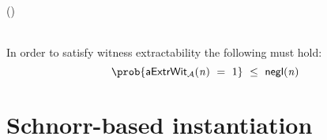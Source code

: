 \begin{definition}
\begin{center}
{\begin{varwidth}{\textwidth}
                \procedure[linenumbering, syntaxhighlight=auto]{$\procNonceOracle{\varSecParam}$} {
                    (\varNonceBob \opSeperate \varRandBob) \opFunResult \procSetupPartSig{\varSecParam} \\
                    \pcreturn \varRandBob
                }
                \procedure[linenumbering, syntaxhighlight=auto]{$\procSignPtOracle{\varMsg}{\varPubKeyAdv}{\varRandAdv}$} {
                    \varSet \opAssign \varSet \opUnion \varMsg \\
                    \pcreturn \procGenPartSig{\varMsg}{\varSecKeyBob}{\varNonceBob}{\varPubKeyAdv}{\varRandAdv}
                }
            \end{varwidth}
        }
    \end{center}
    In order to satisfy witness extractability the following must hold:
    \[ \prob{\procExpExt{\varN} \opEq 1} \opSmEq \funNegl{\varN} \]
\end{definition}

\section{Schnorr-based instantiation}\label{sec:schnorrInst}

